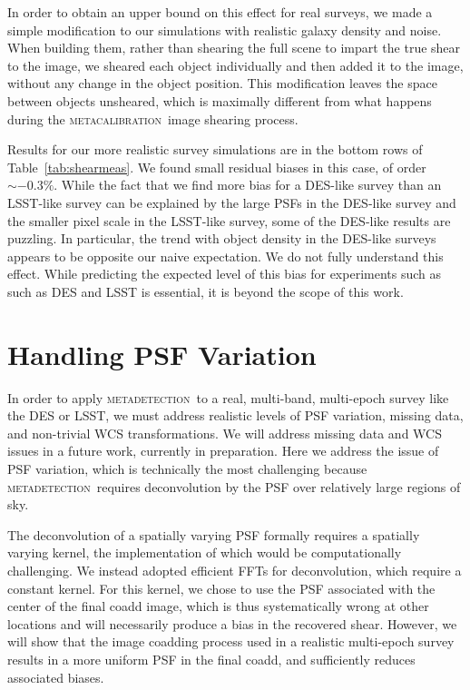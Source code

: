 \documentclass[iop, appendixfloats, numberedappendix, apj]{emulateapj}
\newcommand{\mcal}{\textsc{metacalibration}}
\newcommand{\mdet}{\textsc{metadetection}}
\begin{document}
In order to obtain an upper bound on this effect for real surveys, we made a
simple modification to our simulations with realistic galaxy density and noise.
When building them, rather than shearing the full scene to impart the true
shear to the image, we sheared each object individually and then added it to
the image, without any change in the object position. This modification leaves
the space between objects unsheared, which is maximally different from what
happens during the \mcal\ image shearing process.

Results for our more realistic survey simulations are in the bottom rows
of Table~\ref{tab:shearmeas}. We found small residual biases in this case,
of order $\sim-0.3\%$. While the fact that we find more bias for a DES-like
survey than an LSST-like survey can be explained by the large PSFs in the
DES-like survey and the smaller pixel scale in the LSST-like survey, some of
the DES-like results are puzzling. In particular, the trend with object density
in the DES-like surveys appears to be opposite our naive expectation. We do
not fully understand this effect. While predicting the expected level of this
bias for experiments such as such as DES and LSST is essential, it is beyond
the scope of this work.

\section{Handling PSF Variation}
\label{sec:psfvar}

In order to apply \mdet\ to a real, multi-band, multi-epoch survey like the DES
or LSST, we must address realistic levels of PSF variation, missing data, and
non-trivial WCS transformations. We will address missing data and WCS issues in
a future work, currently in preparation. Here we address the issue of PSF
variation, which is technically the most challenging because \mdet\ requires
deconvolution by the PSF over relatively large regions of sky.

The deconvolution of a spatially varying PSF formally requires a spatially
varying kernel, the implementation of which would be computationally
challenging.  We instead adopted efficient FFTs for deconvolution, which require
a constant kernel.  For this kernel, we chose to use the PSF associated with
the center of the final coadd image, which is thus systematically wrong at
other locations and will necessarily produce a bias in the recovered shear.
However, we will show that the image coadding process used in a realistic
multi-epoch survey results in a more uniform PSF in the final coadd, and
sufficiently reduces associated biases.
\end{document}
